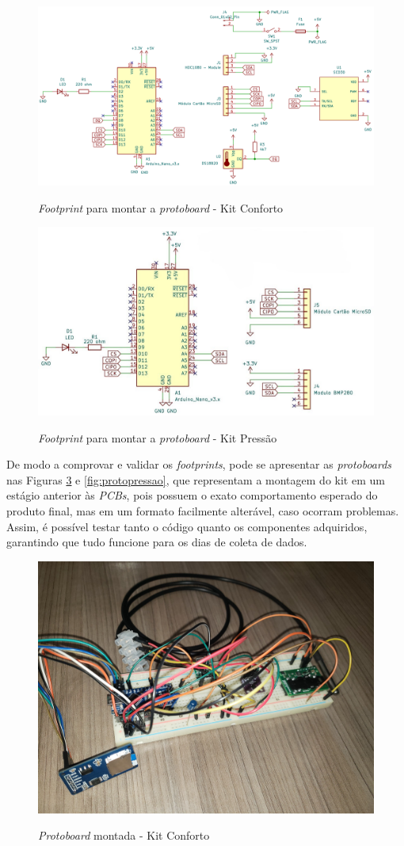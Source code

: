 \documentclass[acronym,symbols,table]{fei}
\begin{document}
\begin{figure}[!htb]
\centering
    \caption{\textit{Footprint} para montar a \textit{protoboard} - Kit Conforto}
    \includegraphics[width=0.7\linewidth]{Imagens/footprintprotoboardint.png}
    \label{fig:footprintprotoboardint}
\end{figure}

\begin{figure}[!htb] 
\centering
    \caption{\textit{Footprint} para montar a \textit{protoboard} - Kit Pressão}
    \includegraphics[width=0.7\linewidth]{Imagens/footprintpressao.jpg} 
    \label{fig:footprintpressao}
\end{figure}
\newpage
De modo a comprovar e validar os \textit{footprints}, pode se apresentar as \textit{protoboards} nas Figuras \ref{fig:protoconforto} e \ref{fig:protopressao}, que representam a montagem do kit em um estágio anterior às \textit{PCBs}, pois possuem o exato comportamento esperado do produto final, mas em um formato facilmente alterável, caso ocorram problemas. Assim, é possível testar tanto o código quanto os componentes adquiridos, garantindo que tudo funcione para os dias de coleta de dados.

\begin{figure}[!htb]
\centering
    \caption{\textit{Protoboard} montada - Kit Conforto}
    \includegraphics[width=0.65\linewidth]{Imagens/protoboardmovel.jpeg}
    \label{fig:protoconforto}
\end{figure}
\end{document}
